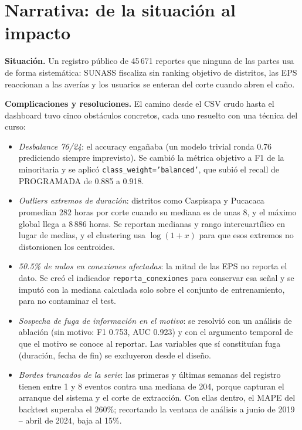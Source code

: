 \documentclass[11pt,a4paper]{article}
\begin{document}
\section{Narrativa: de la situación al impacto}

\textbf{Situación.} Un registro público de 45\,671 reportes que ninguna de las
partes usa de forma sistemática: SUNASS fiscaliza sin ranking objetivo de
distritos, las EPS reaccionan a las averías y los usuarios se enteran del corte
cuando abren el caño.

\textbf{Complicaciones y resoluciones.} El camino desde el CSV crudo hasta el
dashboard tuvo cinco obstáculos concretos, cada uno resuelto con una técnica del
curso:

\begin{itemize}
      \item \emph{Desbalance 76/24}: el accuracy engañaba (un modelo trivial ronda
            0.76 prediciendo siempre imprevisto). Se cambió la métrica objetivo a F1
            de la minoritaria y se aplicó \texttt{class\_weight='balanced'}, que
            subió el recall de PROGRAMADA de 0.885 a 0.918.
      \item \emph{Outliers extremos de duración}: distritos como Caspisapa y Pucacaca
            promedian 282 horas por corte cuando su mediana es de unas 8, y el máximo
            global llega a 8\,886 horas. Se reportan medianas y rango intercuartílico
            en lugar de medias, y el clustering usa $\log(1+x)$ para que esos
            extremos no distorsionen los centroides.
      \item \emph{50.5\% de nulos en conexiones afectadas}: la mitad de las EPS no
            reporta el dato. Se creó el indicador \texttt{reporta\_conexiones} para
            conservar esa señal y se imputó con la mediana calculada solo sobre el
            conjunto de entrenamiento, para no contaminar el test.
      \item \emph{Sospecha de fuga de información en el motivo}: se resolvió con un
            análisis de ablación (sin motivo: F1 0.753, AUC 0.923) y con el argumento
            temporal de que el motivo se conoce al reportar. Las variables que sí
            constituían fuga (duración, fecha de fin) se excluyeron desde el diseño.
      \item \emph{Bordes truncados de la serie}: las primeras y últimas semanas del
            registro tienen entre 1 y 8 eventos contra una mediana de 204, porque
            capturan el arranque del sistema y el corte de extracción. Con ellas
            dentro, el MAPE del backtest superaba el 260\%; recortando la ventana
            de análisis a junio de 2019 -- abril de 2024, baja al 15\%.
\end{itemize}
\end{document}
